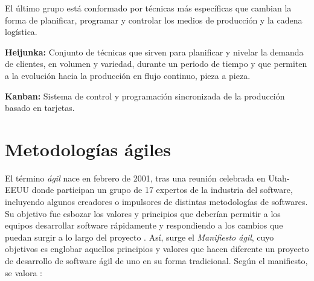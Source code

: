 El último grupo está conformado por técnicas más específicas que cambian la forma de planificar, programar  y controlar los medios de producción y la cadena logística. 

\begin{description}
\item \textbf{Heijunka:} Conjunto de técnicas que sirven para planificar y nivelar la demanda de clientes, en volumen y variedad, durante un periodo de tiempo y que permiten a la evolución hacia la producción en flujo continuo, pieza a pieza.

\item \textbf{Kanban:} Sistema de control y programación sincronizada de la producción basado en tarjetas.
\end{description}


\section{Metodologías ágiles}

El término \textit{ágil} nace en febrero de 2001, tras una reunión celebrada en Utah-EEUU donde participan un grupo de 17 expertos de la industria del software, incluyendo algunos creadores o impulsores de distintas metodologías de softwares. Su objetivo fue esbozar los valores y principios que deberían permitir a los equipos desarrollar software rápidamente y respondiendo a los cambios que puedan surgir a lo largo del proyecto \citep{canos2012}. Así, surge el \textit{Manifiesto ágil}, cuyo objetivos es englobar aquellos principios y valores que hacen diferente un proyecto de desarrollo de software ágil de uno en su forma tradicional. Según el manifiesto, se valora \citep{canos2012}:


